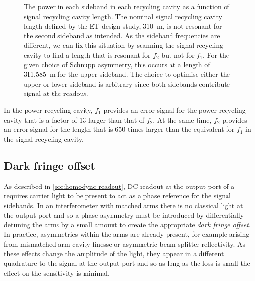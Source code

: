 \begin{figure}
  \centering
  
  \caption[Power of the control sidebands in the signal recycling cavity of \ETLF{} in detuned configuration as a function of signal recycling cavity length]{\label{fig:sideband-powers-srcl-detuned}The power in each sideband in each recycling cavity as a function of signal recycling cavity length. The nominal signal recycling cavity length defined by the \gls{ET} design study, \SI{310}{\meter}, is not resonant for the second sideband as intended. As the sideband frequencies are different, we can fix this situation by scanning the signal recycling cavity to find a length that is resonant for $f_2$ but not for $f_1$. For the given choice of Schnupp asymmetry, this occurs at a length of \SI{311.585}{\meter} for the upper sideband. The choice to optimise either the upper or lower sideband is arbitrary since both sidebands contribute signal at the readout.}
\end{figure}

In the power recycling cavity, $f_1$ provides an error signal for the power recycling cavity that is a factor of \num{13} larger than that of $f_2$. At the same time, $f_2$ provides an error signal for the length that is \num{650} times larger than the equivalent for $f_1$ in the signal recycling cavity.

\subsection{Dark fringe offset}
As described in \cref{sec:homodyne-readout}, \gls{DC} readout at the output port of a \DRFPMI{} requires carrier light to be present to act as a phase reference for the signal sidebands. In an interferometer with matched arms there is no classical light at the output port and so a phase asymmetry must be introduced by differentially detuning the arms by a small amount to create the appropriate \emph{dark fringe offset}. In practice, asymmetries within the arms are already present, for example arising from mismatched arm cavity finesse or asymmetric beam splitter reflectivity. As these effects change the amplitude of the light, they appear in a different quadrature to the signal at the output port and so as long as the loss is small the effect on the sensitivity is minimal.

